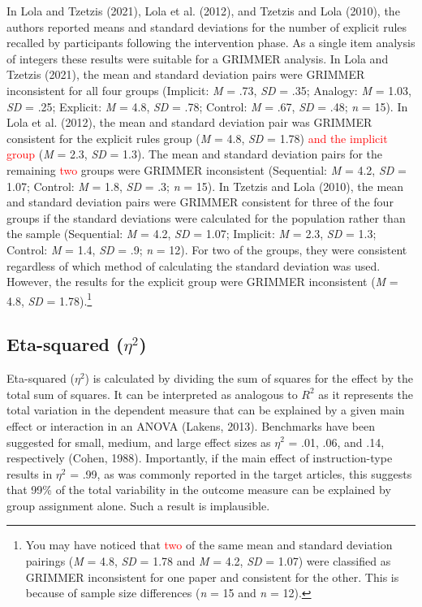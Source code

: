 \documentclass[
  english,
  man, donotrepeattitle,floatsintext]{apa7}
\begin{document}
In Lola and Tzetzis (2021), Lola et al. (2012), and Tzetzis and Lola (2010), the authors reported means and standard deviations for the number of explicit rules recalled by participants following the intervention phase. As a single item analysis of integers these results were suitable for a GRIMMER analysis. In Lola and Tzetzis (2021), the mean and standard deviation pairs were GRIMMER inconsistent for all four groups (Implicit: \emph{M} = .73, \emph{SD} = .35; Analogy: \emph{M} = 1.03, \emph{SD} = .25; Explicit: \emph{M} = 4.8, \emph{SD} = .78; Control: \emph{M} = .67, \emph{SD} = .48; \emph{n} = 15). In Lola et al. (2012), the mean and standard deviation pair was GRIMMER consistent for the explicit rules group (\emph{M} = 4.8, \emph{SD} = 1.78) \textcolor{red}{and the implicit group} (\emph{M} = 2.3, \emph{SD} = 1.3). The mean and standard deviation pairs for the remaining \textcolor{red}{two} groups were GRIMMER inconsistent (Sequential: \emph{M} = 4.2, \emph{SD} = 1.07; Control: \emph{M} = 1.8, \emph{SD} = .3; \emph{n} = 15). In Tzetzis and Lola (2010), the mean and standard deviation pairs were GRIMMER consistent for three of the four groups if the standard deviations were calculated for the population rather than the sample (Sequential: \emph{M} = 4.2, \emph{SD} = 1.07; Implicit: \emph{M} = 2.3, \emph{SD} = 1.3; Control: \emph{M} = 1.4, \emph{SD} = .9; \emph{n} = 12). For two of the groups, they were consistent regardless of which method of calculating the standard deviation was used. However, the results for the explicit group were GRIMMER inconsistent (\emph{M} = 4.8, \emph{SD} = 1.78).\footnote{You may have noticed that \textcolor{red}{two} of the same mean and standard deviation pairings (\emph{M} = 4.8, \emph{SD} = 1.78 and \emph{M} = 4.2, \emph{SD} = 1.07) were classified as GRIMMER inconsistent for one paper and consistent for the other. This is because of sample size differences (\emph{n} = 15 and \emph{n} = 12).}

\hypertarget{eta-squared-eta2-1}{%
\subsection{\texorpdfstring{Eta-squared (\(\eta^{2}\))}{Eta-squared (\textbackslash eta\^{}\{2\})}}\label{eta-squared-eta2-1}}

Eta-squared (\(\eta^{2}\)) is calculated by dividing the sum of squares for the effect by the total sum of squares. It can be interpreted as analogous to \(R^{2}\) as it represents the total variation in the dependent measure that can be explained by a given main effect or interaction in an ANOVA (Lakens, 2013). Benchmarks have been suggested for small, medium, and large effect sizes as \(\eta^{2}\) = .01, .06, and .14, respectively (Cohen, 1988). Importantly, if the main effect of instruction-type results in \(\eta^{2}\) = .99, as was commonly reported in the target articles, this suggests that 99\% of the total variability in the outcome measure can be explained by group assignment alone. Such a result is implausible.
\end{document}
